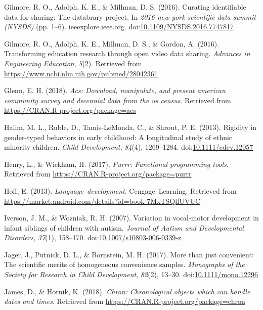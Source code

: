 \documentclass[english,man]{apa6}
\theoremstyle{definition}
\theoremstyle{definition}
\theoremstyle{definition}
\theoremstyle{remark}
\begin{document}
\hypertarget{ref-Gilmore2016-ev}{}
Gilmore, R. O., Adolph, K. E., \& Millman, D. S. (2016). Curating
identifiable data for sharing: The databrary project. In \emph{2016 new
york scientific data summit (NYSDS)} (pp. 1--6). ieeexplore.ieee.org.
doi:\href{https://doi.org/10.1109/NYSDS.2016.7747817}{10.1109/NYSDS.2016.7747817}

\hypertarget{ref-Gilmore2016-wl}{}
Gilmore, R. O., Adolph, K. E., Millman, D. S., \& Gordon, A. (2016).
Transforming education research through open video data sharing.
\emph{Advances in Engineering Education}, \emph{5}(2). Retrieved from
\url{https://www.ncbi.nlm.nih.gov/pubmed/28042361}

\hypertarget{ref-R-acs}{}
Glenn, E. H. (2018). \emph{Acs: Download, manipulate, and present
american community survey and decennial data from the us census}.
Retrieved from \url{https://CRAN.R-project.org/package=acs}

\hypertarget{ref-Halim2013-ez}{}
Halim, M. L., Ruble, D., Tamis-LeMonda, C., \& Shrout, P. E. (2013).
Rigidity in gender-typed behaviors in early childhood: A longitudinal
study of ethnic minority children. \emph{Child Development},
\emph{84}(4), 1269--1284.
doi:\href{https://doi.org/10.1111/cdev.12057}{10.1111/cdev.12057}

\hypertarget{ref-R-purrr}{}
Henry, L., \& Wickham, H. (2017). \emph{Purrr: Functional programming
tools}. Retrieved from \url{https://CRAN.R-project.org/package=purrr}

\hypertarget{ref-Hoff2013-er}{}
Hoff, E. (2013). \emph{Language~development}. Cengage~Learning.
Retrieved from
\url{https://market.android.com/details?id=book-7MxTSQlfUVUC}

\hypertarget{ref-Iverson2007-yr}{}
Iverson, J. M., \& Wozniak, R. H. (2007). Variation in vocal-motor
development in infant siblings of children with autism. \emph{Journal of
Autism and Developmental Disorders}, \emph{37}(1), 158--170.
doi:\href{https://doi.org/10.1007/s10803-006-0339-z}{10.1007/s10803-006-0339-z}

\hypertarget{ref-Jager2017-wv}{}
Jager, J., Putnick, D. L., \& Bornstein, M. H. (2017). More than just
convenient: The scientific merits of homogeneous convenience samples.
\emph{Monographs of the Society for Research in Child Development},
\emph{82}(2), 13--30.
doi:\href{https://doi.org/10.1111/mono.12296}{10.1111/mono.12296}

\hypertarget{ref-R-chron}{}
James, D., \& Hornik, K. (2018). \emph{Chron: Chronological objects
which can handle dates and times}. Retrieved from
\url{https://CRAN.R-project.org/package=chron}
\end{document}
